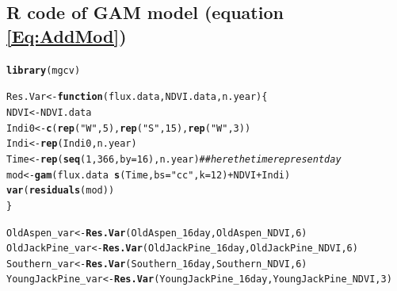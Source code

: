 \documentclass{article}\usepackage[]{graphicx}\usepackage[]{color}
\makeatletter
\newcommand{\hlnum}[1]{\textcolor[rgb]{0.686,0.059,0.569}{#1}}%
\newcommand{\hlstr}[1]{\textcolor[rgb]{0.192,0.494,0.8}{#1}}%
\newcommand{\hlcom}[1]{\textcolor[rgb]{0.678,0.584,0.686}{\textit{#1}}}%
\newcommand{\hlopt}[1]{\textcolor[rgb]{0,0,0}{#1}}%
\newcommand{\hlstd}[1]{\textcolor[rgb]{0.345,0.345,0.345}{#1}}%
\newcommand{\hlkwa}[1]{\textcolor[rgb]{0.161,0.373,0.58}{\textbf{#1}}}%
\newcommand{\hlkwb}[1]{\textcolor[rgb]{0.69,0.353,0.396}{#1}}%
\newcommand{\hlkwc}[1]{\textcolor[rgb]{0.333,0.667,0.333}{#1}}%
\newcommand{\hlkwd}[1]{\textcolor[rgb]{0.737,0.353,0.396}{\textbf{#1}}}%
\newenvironment{kframe}{%
 \def\at@end@of@kframe{}%
 \ifinner\ifhmode%
  \def\at@end@of@kframe{\end{minipage}}%
  \begin{minipage}{\columnwidth}%
 \fi\fi%
 \def\FrameCommand##1{\hskip\@totalleftmargin \hskip-\fboxsep
 \colorbox{shadecolor}{##1}\hskip-\fboxsep
     \hskip-\linewidth \hskip-\@totalleftmargin \hskip\columnwidth}%
 \MakeFramed {\advance\hsize-\width
   \@totalleftmargin\z@ \linewidth\hsize
   \@setminipage}}%
 {\par\unskip\endMakeFramed%
 \at@end@of@kframe}
\newenvironment{knitrout}{}{} %
\makeatother
\begin{document}
\begin{appendices}
\section{R code of GAM model (equation \ref{Eq:AddMod})}\label{sec:gamcode}

\begin{knitrout}
\color{fgcolor}\begin{kframe}
\begin{alltt}
\hlkwd{library}\hlstd{(mgcv)}
\end{alltt}


{\ttfamily\noindent\itshape\color{messagecolor}{\#\# Loading required package: nlme}}

{\ttfamily\noindent\itshape{}}\begin{alltt}
\hlstd{Res.Var} \hlkwb{<-} \hlkwa{function}\hlstd{(}\hlkwc{flux.data}\hlstd{,}\hlkwc{NDVI.data}\hlstd{,}\hlkwc{n.year}\hlstd{)\{}
        \hlstd{NDVI} \hlkwb{<-} \hlstd{NDVI.data}
        \hlstd{Indi0} \hlkwb{<-} \hlkwd{c}\hlstd{(}\hlkwd{rep}\hlstd{(}\hlstr{"W"}\hlstd{,}\hlnum{5}\hlstd{),}\hlkwd{rep}\hlstd{(}\hlstr{"S"}\hlstd{,}\hlnum{15}\hlstd{),}\hlkwd{rep}\hlstd{(}\hlstr{"W"}\hlstd{,}\hlnum{3}\hlstd{))}
        \hlstd{Indi} \hlkwb{<-} \hlkwd{rep}\hlstd{(Indi0, n.year)}
        \hlstd{Time} \hlkwb{<-} \hlkwd{rep}\hlstd{(}\hlkwd{seq}\hlstd{(}\hlnum{1}\hlstd{,}\hlnum{366}\hlstd{,}\hlkwc{by}\hlstd{=}\hlnum{16}\hlstd{),n.year)} \hlcom{## here the time represent day	}
        \hlstd{mod} \hlkwb{<-} \hlkwd{gam}\hlstd{(flux.data} \hlopt{~} \hlkwd{s}\hlstd{(Time,} \hlkwc{bs}\hlstd{=}\hlstr{"cc"}\hlstd{,} \hlkwc{k}\hlstd{=}\hlnum{12}\hlstd{)} \hlopt{+} \hlstd{NDVI} \hlopt{+} \hlstd{Indi)}
        \hlkwd{var}\hlstd{(}\hlkwd{residuals}\hlstd{(mod))}
\hlstd{\}}

\hlstd{OldAspen_var} \hlkwb{<-} \hlkwd{Res.Var}\hlstd{(OldAspen_16day,OldAspen_NDVI,}\hlnum{6}\hlstd{)}
\hlstd{OldJackPine_var} \hlkwb{<-} \hlkwd{Res.Var}\hlstd{(OldJackPine_16day,OldJackPine_NDVI,}\hlnum{6}\hlstd{)}
\hlstd{Southern_var} \hlkwb{<-} \hlkwd{Res.Var}\hlstd{(Southern_16day,Southern_NDVI,}\hlnum{6}\hlstd{)}
\hlstd{YoungJackPine_var} \hlkwb{<-} \hlkwd{Res.Var}\hlstd{(YoungJackPine_16day,YoungJackPine_NDVI,}\hlnum{3}\hlstd{)}


\end{alltt}
\end{kframe}
\end{knitrout}
\end{appendices}
\end{document}
